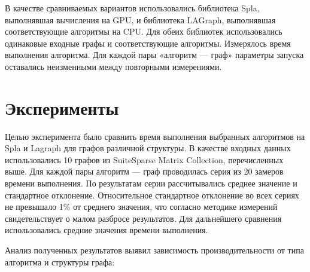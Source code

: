 \documentclass[a4paper]{article}
\begin{document}
	В качестве сравниваемых вариантов использовались библиотека Spla,
	выполнявшая вычисления на GPU, и библиотека LAGraph, выполнявшая
	соответствующие алгоритмы на CPU. Для обеих библиотек использовались
	одинаковые входные графы и соответствующие алгоритмы. Измерялось
	время выполнения алгоритма. Для каждой пары «алгоритм --- граф»
	параметры запуска оставались неизменными между повторными измерениями.
		
	\section{Эксперименты}
	
	Целью эксперимента было сравнить время выполнения выбранных алгоритмов на Spla и Lagraph для графов различной структуры. В качестве входных данных использовались 10 графов из SuiteSparse Matrix Collection, перечисленных выше. Для каждой пары алгоритм --- граф проводилась серия из 20 замеров времени выполнения.
	 По результатам серии рассчитывались среднее
	значение и стандартное отклонение. Относительное стандартное
	отклонение во всех сериях не превышало 1\% от среднего значения,
	что согласно методике измерений свидетельствует о малом разбросе
	результатов. Для дальнейшего сравнения использовались средние
	значения времени выполнения.
	
	Анализ полученных результатов выявил зависимость производительности от типа алгоритма и структуры графа:
	
\end{document}
